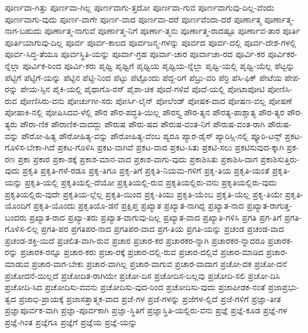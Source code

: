 {ಪೂರ್ಣವಾ-ಗಿತ್ತು
ಪೂರ್ಣವಾ-ಗಿಲ್ಲ
ಪೂರ್ಣವಾಗು-ತ್ತದೋ
ಪೂರ್ಣವಾ-ಗುವ
ಪೂರ್ಣವಾಗುವು-ದಿಲ್ಲ-ವೆಂದು
ಪೂರ್ಣವಾಗು-ವುದು
ಪೂರ್ಣ-ವಾಗೇ
ಪೂರ್ಣ-ವಾದ
ಪೂರ್ಣವಾ-ದರೆ
ಪೂರ್ಣವೆಂದಾ-ದರೆ
ಪೂರ್ಣಾತ್ಮ
ಪೂರ್ಣಾತ್ಮ-ನಾಗ-ಬಹುದು
ಪೂರ್ಣಾತ್ಮ-ನಾಗುವೆ
ಪೂರ್ಣಾತ್ಮ-ನಿಗೆ
ಪೂರ್ಣಾ-ತ್ಮನು
ಪೂರ್ಣಾತ್ಮ-ರಾದಷ್ಟೂ
ಪೂರ್ಣಾವ-ತಾರ
ಪೂರ್ತಿ
ಪೂರ್ತಿಯಾಗುವು-ದಿಲ್ಲ
ಪೂರ್ವ
ಪೂರ್ವ-ಕಾಲದ
ಪೂರ್ವಜನ್ಮ-ಗಳನ್ನು
ಪೂರ್ವದ
ಪೂರ್ವ-ದಲ್ಲಿ
ಪೂರ್ವ-ದೇಶ-ಗಳಲ್ಲಿ
ಪೂರ್ವ-ಸಿದ್ಧ-ತೆಯೂ
ಪೂರ್ವಸ್ಥಿತಿ-ಯನ್ನು
ಪೂರ್ವಾ-ಗ್ರಹ
ಪೂರ್ವಾ-ಚಾರ
ಪೂರ್ವಾಚಾ-ರದ
ಪೂರ್ವಿ-ಕರ
ಪೂರ್ವಿಕರ-ನ್ನೆಲ್ಲಾ
ಪೂರ್ವಿಕ-ರಿಂದ
ಪೂರ್ವಿ-ಕರು
ಪೃಥ್ವಿ
ಪೃಥ್ವಿಗೆ
ಪೃಥ್ವಿಯ
ಪೃಥ್ವಿಯ-ನ್ನೆಲ್ಲಾ
ಪೃಥ್ವಿ-ಯಲ್ಲಿ
ಪೃಥ್ವಿ-ಯೆಲ್ಲ
ಪೆಟ್ಟನ್ನು
ಪೆಟ್ಟಿಗೆ
ಪೆಟ್ಟಿಗೆ-ಯನ್ನು
ಪೆಟ್ಟಿನ
ಪೆಟ್ಟಿ-ನಿಂದ
ಪೆಟ್ಟು
ಪೆಟ್ಟೊಂದು
ಪೆದ್ದ-ರಿಗೆ
ಪೆಬ್ರು-ವರಿ
ಪೆರ್ರಿ
ಪೆಸಿ-ಫಿಕ್
ಪೇಟೆಯ
ಪೇಪ-ರನ್ನು
ಪೇಯ-ಸ್ಸಿನ
ಪೈಕಿ-ಯಲ್ಲಿ
ಪೈಥಾಗೊ-ರಸ್
ಪೈಶಾ-ಚಿಕ
ಪೊದೆ-ಗಳಿವೆ
ಪೊದೆ-ಯಲ್ಲಿ
ಪೋಟಾಪೋಟಿ
ಪೋಣಿಸಿ-ರುವ
ಪೋಣಿಸಿರು-ವನು
ಪೋರ್ಚುಗೀ-ಸರು
ಪೋರ್ಸಿ-ಲೈನ್
ಪೋಲೆಂಡ್
ಪೋಷಕ-ವಾದ
ಪೋಷಣ-ವಲ್ಲ
ಪೋಷಣೆ
ಪೋಷಾಕಿ-ನಲ್ಲಿ
ಪೋಷಿಸಿದವ-ಳೆಲ್ಲಿ
ಪೌರ
ಪೌರ-ಪದ್ಧತಿ-ಯಿಲ್ಲ
ಪೌರಸ್ತ್ಯ
ಪೌರ-ತ್ಯನ
ಪೌರತ್ಯ-ಪಾಶ್ಚಾತ್ಯ
ಪೌರ-ತ್ಯರ
ಪೌರ-ತ್ಯರು
ಪೌರಾ-ಣಿಕ
ಪೌರಾಣಿಕ-ವಾದದ್ದು
ಪೌರುಷ
ಪೌರು-ಷದ
ಪೌರುಷ-ವಂತ-ನಿಗೆ
ಪೌರುಷ-ವಂತ-ರಾಗಿ
ಪೌರುಷ-ವನ್ನು
ಪೌರೋ-ಹಿತ್ಯ
ಪೌರೋಹಿತ್ಯ-ವನ್ನು
ಪೌರೋಹಿತ್ಯ-ವೆಂಬ
ಪ್ಯರೂ
ಪ್ಯಾರ-ಡೈಸ್
ಪ್ಯಾರಿಸ್ಸಿ-ನಲ್ಲಿ
ಪ್ಯೂರಿ-ಟನ್ಸ್
ಪ್ರಕಟ-ಗೊಳಿಸ-ಬೇಕಾ-ಗಿದೆ
ಪ್ರಕಟ-ಗೊಳಿಸಿ
ಪ್ರಕಟ-ವಾಗಿವೆ
ಪ್ರಕಟ-ವಾದ
ಪ್ರಕಟ-ಸಿತು
ಪ್ರಕಟಿ-ಸಲು
ಪ್ರಕಟಿಸುವುದ-ಕ್ಕಾಗಿ
ಪ್ರಕ-ರಣ
ಪ್ರಕಾ
ಪ್ರಕಾರ
ಪ್ರಕಾ-ಶಕ್ಕೆ
ಪ್ರಕಾಶ-ಮಾನ-ವಾದ
ಪ್ರಕಾಶ-ವಾಗು-ವುದು
ಪ್ರಕಾಶಿಸಿತು
ಪ್ರಕಾಶಿಸಿ-ದಾಗ
ಪ್ರಕಾಶಿಸುತ್ತಿರು-ವುದು
ಪ್ರಕೃತಿ
ಪ್ರಕೃತಿ-ಗಳೆ-ರಡೂ
ಪ್ರಕೃ-ತಿಗೂ
ಪ್ರಕೃ-ತಿಗೆ
ಪ್ರಕೃತಿ-ನಿಯಮ-ಗಳಿಗೆ
ಪ್ರಕೃ-ತಿಯ
ಪ್ರಕೃತಿ-ಯಂತೆ
ಪ್ರಕೃತಿ-ಯನ್ನು
ಪ್ರಕೃತಿ-ಯಲ್ಲಿ
ಪ್ರಕೃತಿಯಲ್ಲಿ-ದೆಯೋ
ಪ್ರಕೃತಿಯಲ್ಲಿ-ರುವ
ಪ್ರಕೃತಿಯಲ್ಲಿರು-ವನು
ಪ್ರಕೃತಿಯಲ್ಲಿರು-ವುದು
ಪ್ರಕೃತಿಯಲ್ಲಿರು-ವುದೇ
ಪ್ರಕೃತಿಯ-ಲ್ಲೆಲ್ಲ
ಪ್ರಕೃತಿ-ಯಿಂದ
ಪ್ರಕೃ-ತಿಯು
ಪ್ರಕೃತಿ-ಯೆಂಬ
ಪ್ರಕೃತಿ-ಯೆಲ್ಲ
ಪ್ರಕೃ-ತಿಯೇ
ಪ್ರಕೃತಿ-ಯೊಂದಿಗೆ
ಪ್ರಕೃತಿ-ಯೊಂದು
ಪ್ರಕೃತಿಯೊ-ಡನೆ
ಪ್ರಕ್ಷಿಪ್ತ
ಪ್ರಖ್ಯಾತ
ಪ್ರಖ್ಯಾತ-ನಾಗಿದ್ದ
ಪ್ರಖ್ಯಾತ-ನಾದ
ಪ್ರಖ್ಯಾತ-ರಾಗುತ್ತ-ಬಂದರು
ಪ್ರಖ್ಯಾತ-ರಾದ
ಪ್ರಖ್ಯಾ-ತರು
ಪ್ರಖ್ಯಾತ-ವಾಗುವು-ದಿಲ್ಲ
ಪ್ರಖ್ಯಾತ-ವಾದ
ಪ್ರಖ್ಯಾತಿ-ಗಳಿಸಿ
ಪ್ರಗತಿ
ಪ್ರಗ-ತಿಗೆ
ಪ್ರಗತಿ-ಗೊಳಿಸ-ಲಿಲ್ಲ
ಪ್ರಗತಿ-ಪರ
ಪ್ರಗತಿಪರ-ನಾದ
ಪ್ರಗತಿಪರ-ವಾದ
ಪ್ರಗ-ತಿಯ
ಪ್ರಗತಿ-ಯನ್ನು
ಪ್ರಚಂಡ
ಪ್ರಚಂಡ-ವಾದ
ಪ್ರಚಂಡ-ಶಕ್ತಿ-ಯಿದೆ
ಪ್ರಚಲಿತ-ವಾಗಿ-ರುವ
ಪ್ರಚಾರ
ಪ್ರಚಾರ-ಕರ
ಪ್ರಚಾರಕರ-ನ್ನಾಗಿ
ಪ್ರಚಾರಕರ-ನ್ನಾದರೂ
ಪ್ರಚಾರಕ-ರನ್ನು
ಪ್ರಚಾರಕ-ರನ್ನೂ
ಪ್ರಚಾರ-ಕರು
ಪ್ರಚಾ-ರಕ್ಕೆ
ಪ್ರಚಾರ-ದಲ್ಲಿ-ರುವ
ಪ್ರಚಾರ-ದಲ್ಲಿವೆ
ಪ್ರಚಾರ-ಮಾಡಿದ
ಪ್ರಚಾರ-ಮಾಡುವ
ಪ್ರಚಾರ-ವಾಗ-ಬೇಕು
ಪ್ರಚಾರ-ವಾಗಿಲ್ಲ
ಪ್ರಚಾರ-ವಾಗುವ
ಪ್ರಚಾರ-ವಾದಾಗ
ಪ್ರಚೋ-ದಕ
ಪ್ರಚೋ-ದನೆ
ಪ್ರಚೋದನೆ-ಯಿಲ್ಲದೆ
ಪ್ರಚೋದಿತ-ರಾಗಿಯೇ
ಪ್ರಚೋ-ದಿಸ
ಪ್ರಚೋದಿಸ-ಬಲ್ಲವು
ಪ್ರಚೋದಿ-ಸಲಿ
ಪ್ರಚೋ-ದಿಸಿ
ಪ್ರಚೋದಿ-ಸಿದ
ಪ್ರಚೋದಿಸು-ವವನು
ಪ್ರಚೋದಿಸು-ವುದ-ರಿಂದ
ಪ್ರಚೋದಿಸು-ವುದು
ಪ್ರಜಾಪೀಡಕ-ನಂತೆ
ಪ್ರಜಾಪ್ರಭು-ತ್ವದ
ಪ್ರಜಾಭಿ-ಪ್ರಾಯಕ್ಕೆ
ಪ್ರಜಾಸತ್ತಾತ್ಮಕ-ವಾದ
ಪ್ರಜೆ-ಗಳ
ಪ್ರಜೆ-ಗಳನ್ನು
ಪ್ರಜೆಗಳ-ಲ್ಲಿದೆ
ಪ್ರಜೆ-ಗಳಿಗೆ
ಪ್ರಜ್ಞಾ-ತೀತ
ಪ್ರಜ್ಞಾಪೂರ್ವಕ-ವಾಗಿ
ಪ್ರಜ್ಞಾ-ಪೂರ್ವಕಾಗಿ
ಪ್ರಜ್ಞಾ-ಸ್ಥಿತಿಗೆ
ಪ್ರಜ್ಞಾಸ್ಥಿತಿ-ಯಲ್ಲಿರು-ವನು
ಪ್ರಜ್ಞೆ
ಪ್ರಜ್ಞೆ-ಕೂಡ
ಪ್ರಜ್ಞೆ-ಗಳ
ಪ್ರಜ್ಞೆ-ಗಿಂತ
ಪ್ರಜ್ಞೆಗೂ
ಪ್ರಜ್ಞೆಗೆ
ಪ್ರಜ್ಞೆಯ
ಪ್ರಜ್ಞೆ-ಯನ್ನು
}
